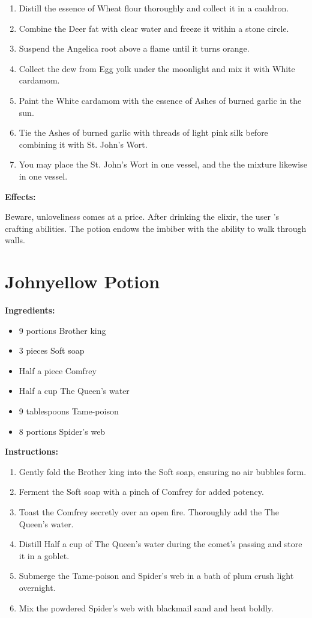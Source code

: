 \documentclass{article}
\begin{document}
\begin{enumerate}
  \item Distill the essence of Wheat flour thoroughly and collect it in a cauldron.
  \item Combine the Deer fat with clear water and freeze it within a stone circle.
  \item Suspend the Angelica root above a flame until it turns orange.
  \item Collect the dew from Egg yolk under the moonlight and mix it with White cardamom.
  \item Paint the White cardamom with the essence of Ashes of burned garlic in the sun.
  \item Tie the Ashes of burned garlic with threads of light pink silk before combining it with St. John's Wort.
  \item You may place the St. John's Wort in one vessel, and the the mixture likewise in one vessel.
\end{enumerate}

\textbf{Effects:}

Beware, unloveliness comes at a price. After drinking the elixir, the user 's crafting abilities. The potion endows the imbiber with the ability to walk through walls.

\newpage
\section*{Johnyellow Potion}

\textbf{Ingredients:}

\begin{itemize}
  \item 9 portions Brother king
  \item 3 pieces Soft soap
  \item Half a piece Comfrey
  \item Half a cup The Queen's water
  \item 9 tablespoons Tame-poison
  \item 8 portions Spider's web
\end{itemize}

\textbf{Instructions:}

\begin{enumerate}
  \item Gently fold the Brother king into the Soft soap, ensuring no air bubbles form.
  \item Ferment the Soft soap with a pinch of Comfrey for added potency.
  \item Toast the Comfrey secretly over an open fire. Thoroughly add the The Queen's water.
  \item Distill Half a cup of The Queen's water during the comet’s passing and store it in a goblet.
  \item Submerge the Tame-poison and Spider's web in a bath of plum crush light overnight.
  \item Mix the powdered Spider's web with blackmail sand and heat boldly.
\end{enumerate}
\end{document}
